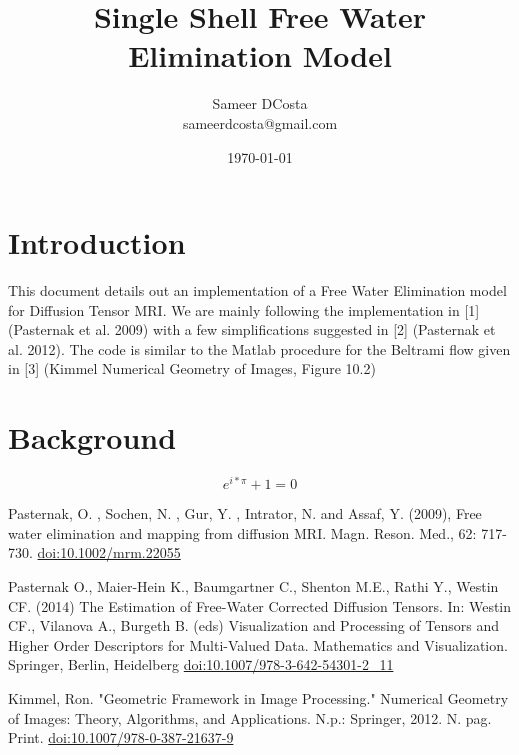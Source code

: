 \documentclass[12pt]{article}
\title{Single Shell Free Water Elimination Model}
\author{
  Sameer DCosta \\
    sameerdcosta@gmail.com
}
\date{\today}
\begin{document}
\maketitle

\section{Introduction}
This document details out an implementation of a Free Water Elimination model
for Diffusion Tensor MRI. We are mainly following the implementation in [1]
(Pasternak et al. 2009) with a few simplifications suggested in [2] (Pasternak
et al. 2012). The code is similar to the Matlab procedure for the Beltrami flow
given in [3] (Kimmel Numerical Geometry of Images, Figure 10.2)

\section{Background}
$$ e^{i * \pi} + 1 = 0$$

\begin{thebibliography}{9}
Pasternak, O. , Sochen, N. , Gur, Y. , Intrator, N. and Assaf, Y. (2009), Free
water elimination and mapping from diffusion MRI. Magn. Reson. Med., 62:
717-730. \href{https://doi.org/10.1002/mrm.22055}{doi:10.1002/mrm.22055}

Pasternak O., Maier-Hein K., Baumgartner C., Shenton M.E., Rathi Y., Westin CF.
(2014) The Estimation of Free-Water Corrected Diffusion Tensors. In: Westin
CF., Vilanova A., Burgeth B. (eds) Visualization and Processing of Tensors and
Higher Order Descriptors for Multi-Valued Data. Mathematics and Visualization.
Springer, Berlin, Heidelberg \href{https://doi.org/10.1007/978-3-642-54301-2\_11}{doi:10.1007/978-3-642-54301-2\_11}

Kimmel, Ron. "Geometric Framework in Image Processing." Numerical Geometry of
Images: Theory, Algorithms, and Applications. N.p.: Springer, 2012. N. pag.
Print. \href{https://doi.org/10.1007/978-0-387-21637-9}{doi:10.1007/978-0-387-21637-9}

\end{thebibliography}
\end{document}

